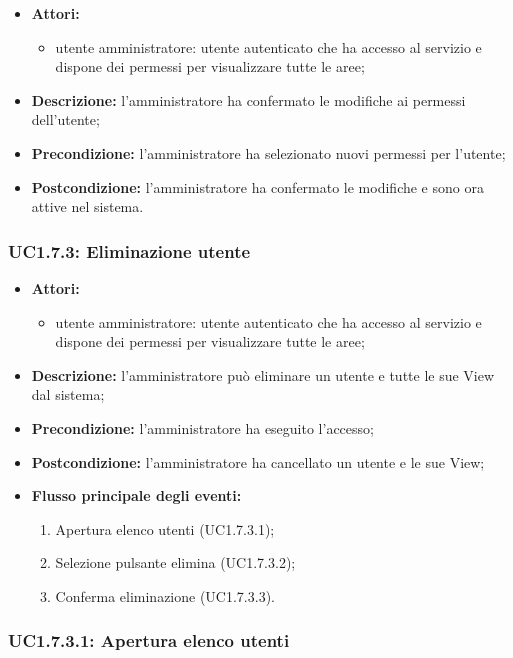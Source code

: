 \begin{itemize}
	\item \textbf{Attori:}
	\begin{itemize}
		\item utente amministratore: utente autenticato che ha accesso al servizio e dispone dei permessi per visualizzare tutte le aree;
	\end{itemize}
	\item \textbf{Descrizione:} l'amministratore ha confermato le modifiche ai permessi dell'utente;
	\item \textbf{Precondizione:} l'amministratore ha selezionato nuovi permessi per l'utente;
	\item \textbf{Postcondizione:} l'amministratore ha confermato le modifiche e sono ora attive nel sistema.
\end{itemize}

\subsubsection{UC1.7.3: Eliminazione utente}

\begin{itemize}
	\item \textbf{Attori:}
	\begin{itemize}
		\item utente amministratore: utente autenticato che ha accesso al servizio e dispone dei permessi per visualizzare tutte le aree;
	\end{itemize}
	\item \textbf{Descrizione:} l'amministratore può eliminare un utente e tutte le sue View dal sistema;
	\item \textbf{Precondizione:} l'amministratore ha eseguito l'accesso;
	\item \textbf{Postcondizione:} l'amministratore ha cancellato un utente e le sue View;
	\item \textbf{Flusso principale degli eventi:}
	\begin{enumerate}
		\item Apertura elenco utenti (UC1.7.3.1);
		\item Selezione pulsante elimina (UC1.7.3.2);
		\item Conferma eliminazione (UC1.7.3.3).
	\end{enumerate}
\end{itemize}

\subsubsection{UC1.7.3.1: Apertura elenco utenti}

